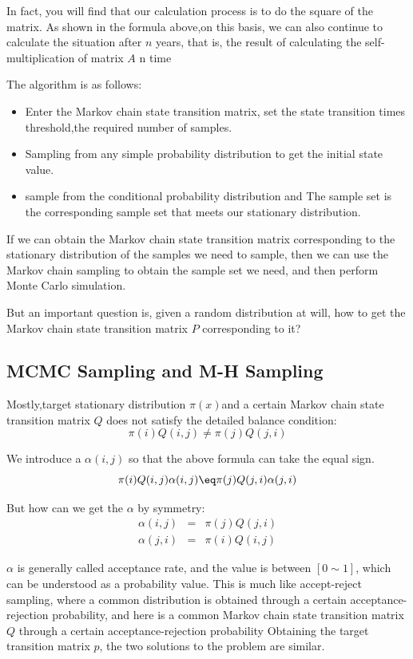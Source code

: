 In fact, you will find that our calculation process is to do the square of the matrix. As shown in the formula above,on this basis, we can also continue to calculate the situation after $n$ years, that is, the result of calculating the self-multiplication of matrix $A$ n time

The algorithm is as follows:
\begin{itemize}
  \item Enter the Markov chain state transition matrix, set the state transition times threshold,the required number of samples.
  \item Sampling from any simple probability distribution to get the initial state value.
  \item sample  from the conditional probability distribution and The sample set is the corresponding sample set that meets our stationary distribution.
\end{itemize}

If we can obtain the Markov chain state transition matrix corresponding to the stationary distribution of the samples we need to sample, then we can use the Markov chain sampling to obtain the sample set we need, and then perform Monte Carlo simulation.

But an important question is, given a random distribution at will, how to get the Markov chain state transition matrix $P$ corresponding to it?

\subsection{MCMC Sampling and M-H Sampling}
Mostly,target stationary distribution $\pi(x)$and a certain Markov chain state transition matrix $Q$ does not satisfy the detailed balance condition:
\[
  \pi(i)Q(i,j) \neq \pi(j)Q(j,i)
\]


We introduce a $\alpha(i,j)$ so that the above formula can take the equal sign.
\[
  \pi(i)Q(i,j)\alpha(i,j) \eq \pi(j)Q(j,i)\alpha(j,i)
\]

But how can we get the $\alpha$ by symmetry:
\begin{eqnarray*}
\alpha(i,j) &=& \pi(j)Q(j,i)\\
\alpha(j,i) &=& \pi(i)Q(i,j)
\end{eqnarray*}


$\alpha$ is generally called acceptance rate, and the value is between $[0  \sim 1]$, which can be understood as a probability value. This is much like accept-reject sampling, where a common distribution is obtained through a certain acceptance-rejection probability, and here is a common Markov chain state transition matrix $Q$ through a certain acceptance-rejection probability Obtaining the target transition matrix $p$, the two solutions to the problem are similar.\cite{mh}

